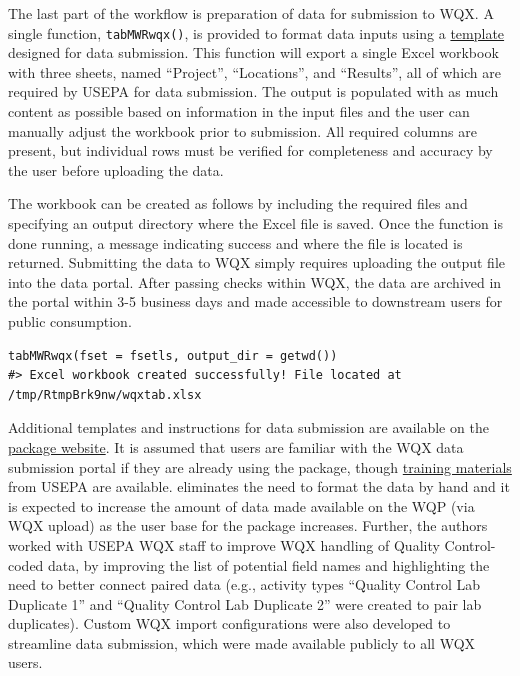 The last part of the  workflow is preparation of data for submission to WQX. A single function, \texttt{tabMWRwqx()}, is provided to format data inputs using a \href{https://massbays-tech.github.io/MassWateR/RESOURCES.html}{template} designed for data submission. This function will export a single Excel workbook with three sheets, named ``Project'', ``Locations'', and ``Results'', all of which are required by USEPA for data submission. The output is populated with as much content as possible based on information in the input files and the user can manually adjust the workbook prior to submission. All required columns are present, but individual rows must be verified for completeness and accuracy by the user before uploading the data.

The workbook can be created as follows by including the required files and specifying an output directory where the Excel file is saved. Once the function is done running, a message indicating success and where the file is located is returned. Submitting the data to WQX simply requires uploading the output file into the data portal. After passing checks within WQX, the data are archived in the portal within 3-5 business days and made accessible to downstream users for public consumption.

\begin{verbatim}
tabMWRwqx(fset = fsetls, output_dir = getwd())
#> Excel workbook created successfully! File located at /tmp/RtmpBrk9nw/wqxtab.xlsx
\end{verbatim}

Additional templates and instructions for data submission are available on the \href{https://massbays-tech.github.io/MassWateR/index.html}{package website}. It is assumed that users are familiar with the WQX data submission portal if they are already using the package, though \href{https://www.epa.gov/waterdata/learn-more-about-water-quality-data}{training materials} from USEPA are available.  eliminates the need to format the data by hand and it is expected to increase the amount of data made available on the WQP (via WQX upload) as the user base for the package increases. Further, the authors worked with USEPA WQX staff to improve WQX handling of Quality Control-coded data, by improving the list of potential field names and highlighting the need to better connect paired data (e.g., activity types ``Quality Control Lab Duplicate 1'' and ``Quality Control Lab Duplicate 2'' were created to pair lab duplicates). Custom WQX import configurations were also developed to streamline data submission, which were made available publicly to all WQX users.


